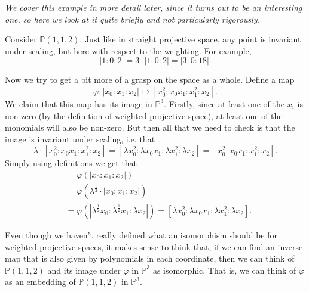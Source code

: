 \documentclass[10pt,notitlepage]{article}
\numberwithin{equation}{subsection}
\newcommand{\pee}{\mathbb{P}}
\begin{document}
    \begin{example}
    \label{ex:something_like_a_cone}
        \textit{We cover this example in more detail later, since it turns out to be an interesting one, so here we look at it quite briefly and not particularly rigorously.}
        
        Consider $\pee(1,1,2)$.
        Just like in straight projective space, any point is invariant under scaling, but here with respect to the weighting.
        For example,
        \[
            |1:0:2| = 3\cdot|1:0:2| = |3:0:18|.
        \]

        Now we try to get a bit more of a grasp on the space as a whole.
        Define a map
        \[
            \varphi\colon |x_0:x_1:x_2| \mapsto [x_0^2:x_0x_1:x_1^2:x_2].
        \]
        We claim that this map has its image in $\pee^3$.
        Firstly, since at least one of the $x_i$ is non-zero (by the definition of weighted projective space), at least one of the monomials will also be non-zero.
        But then all that we need to check is that the image is invariant under scaling, i.e. that
        \[
            \lambda\cdot[x_0^2:x_0x_1:x_1^2:x_2] = [\lambda x_0^2:\lambda x_0x_1:\lambda x_1^2:\lambda x_2] = [x_0^2:x_0x_1:x_1^2:x_2].
        \]
        Simply using definitions we get that
        \begin{align*}
            [x_0^2:x_0x_1:x_1^2:x_2] &= \varphi(|x_0:x_1:x_2|) \\
            &= \varphi\left(\lambda^{\frac12}\cdot|x_0:x_1:x_2|\right) \\
            &= \varphi\left(|\lambda^{\frac12}x_0:\lambda^{\frac12}x_1:\lambda x_2|\right) = [\lambda x_0^2:\lambda x_0x_1:\lambda x_1^2:\lambda x_2].
        \end{align*}

        Even though we haven't really defined what an isomorphism should be for weighted projective spaces, it makes sense to think that, if we can find an inverse map that is also given by polynomials in each coordinate, then we can think of $\pee(1,1,2)$ and its image under $\varphi$ in $\pee^3$ as isomorphic.
        That is, we can think of $\varphi$ as an embedding of $\pee(1,1,2)$ in $\pee^3$.


\end{example}
\end{document}

